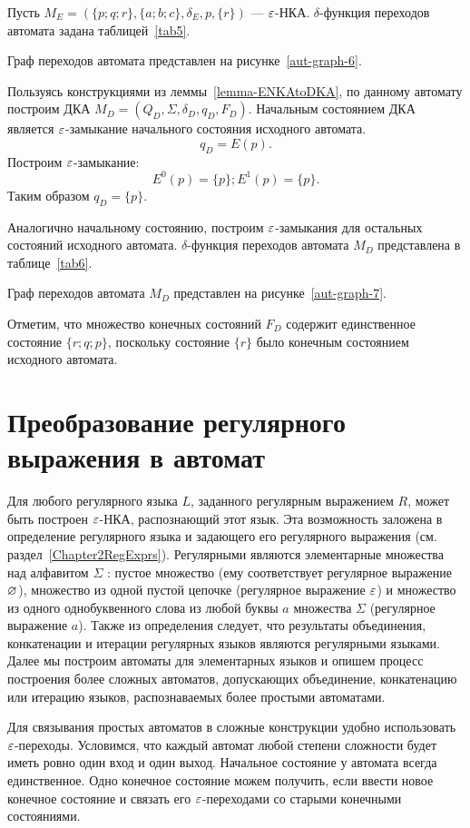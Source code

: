 \begin{myexample}
\label{example-reduceENKAtoDKA}
Пусть $M_E = (\{ p; q; r \},\{ a; b; c \}, \delta_E, p, \{ r \})$ --- $\varepsilon$-НКА. $\delta$-функция переходов автомата задана таблицей~\ref{tab5}. 

Граф переходов автомата представлен на рисунке~\ref{aut-graph-6}.

Пользуясь конструкциями из леммы~\ref{lemma-ENKAtoDKA}, по данному автомату построим ДКА $M_D = (Q_D, \Sigma, \delta_D, q_D, F_D)$.
Начальным состоянием ДКА является $\varepsilon$-замыкание начального состояния исходного автомата.
\[
	q_D = E(p).
\]
Построим $\varepsilon$-замыкание:
\[
	E^0(p) = \{ p \};
	E^1(p) = \{ p \}.
\]
Таким образом $q_D = \{ p \}$.

Аналогично начальному состоянию, построим $\varepsilon$-замыкания для остальных состояний исходного автомата. $\delta$-функция переходов автомата $M_D$ представлена в таблице~\ref{tab6}.

Граф переходов автомата $M_D$  представлен на рисунке~\ref{aut-graph-7}.

Отметим, что множество конечных состояний $F_D$ содержит единственное состояние $\{ r; q; p \}$, поскольку состояние $\{ r \}$ было конечным состоянием исходного автомата.
\end{myexample}

\section{Преобразование регулярного выражения в автомат}
\label{Chapter4RegtoFA}
Для любого регулярного языка $L$, заданного регулярным выражением $R$, может быть построен $\varepsilon$-НКА, распознающий этот язык. Эта возможность заложена в определение регулярного языка и задающего его регулярного выражения (см. раздел~\ref{Chapter2RegExprs}). Регулярными являются элементарные множества над алфавитом $\Sigma$ : пустое множество (ему соответствует регулярное выражение $\varnothing$), множество из одной пустой цепочке (регулярное выражение $\varepsilon$) и множество из одного однобуквенного слова из любой буквы $a$ множества $\Sigma$ (регулярное выражение $a$). Также из определения следует, что результаты объединения, конкатенации и итерации регулярных языков являются регулярными языками. Далее мы построим автоматы для элементарных языков и опишем процесс построения более сложных автоматов, допускающих объединение, конкатенацию или итерацию языков, распознаваемых более простыми автоматами.

Для связывания простых автоматов в сложные конструкции удобно использовать $\varepsilon$-переходы. Условимся, что каждый автомат любой степени сложности будет иметь ровно один вход и один выход. Начальное состояние у автомата всегда единственное. Одно конечное состояние можем получить, если ввести новое конечное состояние и связать его $\varepsilon$-переходами со старыми конечными состояниями.

